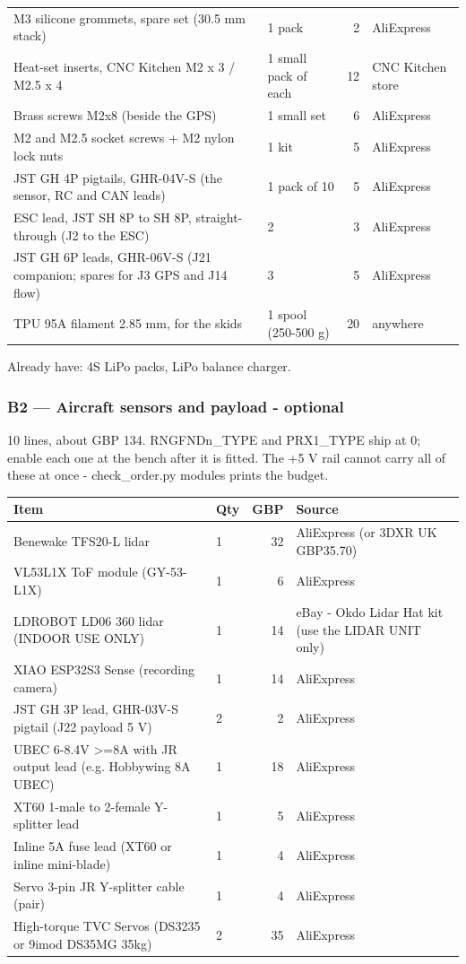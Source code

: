 \documentclass[11pt,a4paper]{article}
\begin{document}
\begin{longtable}{@{}P{0.50\textwidth}P{0.12\textwidth}rP{0.22\textwidth}@{}}
M3 silicone grommets, spare set (30.5 mm stack) & 1 pack & 2 & AliExpress \\
Heat-set inserts, CNC Kitchen M2 x 3 / M2.5 x 4 & 1 small pack of each & 12 & CNC Kitchen store \\
Brass screws M2x8 (beside the GPS) & 1 small set & 6 & AliExpress \\
M2 and M2.5 socket screws + M2 nylon lock nuts & 1 kit & 5 & AliExpress \\
JST GH 4P pigtails, GHR-04V-S (the sensor, RC and CAN leads) & 1 pack of 10 & 5 & AliExpress \\
ESC lead, JST SH 8P to SH 8P, straight-through (J2 to the ESC) & 2 & 3 & AliExpress \\
JST GH 6P leads, GHR-06V-S (J21 companion; spares for J3 GPS and J14 flow) & 3 & 5 & AliExpress \\
TPU 95A filament 2.85 mm, for the skids & 1 spool (250-500 g) & 20 & anywhere \\
\end{longtable}
Already have: 4S LiPo packs, LiPo balance charger.

\subsubsection*{B2 --- Aircraft sensors and payload - optional} 10 lines, about GBP 134.
RNGFNDn\_TYPE and PRX1\_TYPE ship at 0; enable each one at the bench after it is fitted. The +5 V rail cannot carry all of these at once - check\_order.py modules prints the budget.

\begin{longtable}{@{}P{0.50\textwidth}P{0.12\textwidth}rP{0.22\textwidth}@{}}
\toprule
\textbf{Item} & \textbf{Qty} & \textbf{GBP} & \textbf{Source} \\ \midrule
\endhead
\bottomrule
\endfoot
Benewake TFS20-L lidar & 1 & 32 & AliExpress (or 3DXR UK GBP35.70) \\
VL53L1X ToF module (GY-53-L1X) & 1 & 6 & AliExpress \\
LDROBOT LD06 360 lidar (INDOOR USE ONLY) & 1 & 14 & eBay - Okdo Lidar Hat kit (use the LIDAR UNIT only) \\
XIAO ESP32S3 Sense (recording camera) & 1 & 14 & AliExpress \\
JST GH 3P lead, GHR-03V-S pigtail (J22 payload 5 V) & 2 & 2 & AliExpress \\
UBEC 6-8.4V >=8A with JR output lead (e.g. Hobbywing 8A UBEC) & 1 & 18 & AliExpress \\
XT60 1-male to 2-female Y-splitter lead & 1 & 5 & AliExpress \\
Inline 5A fuse lead (XT60 or inline mini-blade) & 1 & 4 & AliExpress \\
Servo 3-pin JR Y-splitter cable (pair) & 1 & 4 & AliExpress \\
High-torque TVC Servos (DS3235 or 9imod DS35MG 35kg) & 2 & 35 & AliExpress \\
\end{longtable}
\end{document}
